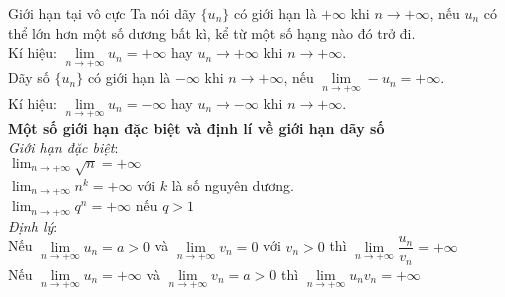 \begin{dang}{Giới hạn tại vô cực}
		Ta nói dãy $\{u_n\}$ có giới hạn là $+ \infty$ khi $n \rightarrow + \infty$, nếu $u_n$ có thể lớn hơn một số dương bất kì, kể từ một số hạng nào đó trở đi. \\
	Kí hiệu: $\lim \limits_{n \to +\infty}u_n = + \infty$ hay $u_n \rightarrow + \infty$ khi $n \rightarrow + \infty$. \\ 
	Dãy số $\{u_n\}$ có giới hạn là $- \infty$ khi $n \rightarrow + \infty$, nếu $\lim \limits_{n \to +\infty}- u_n = + \infty$. \\
	Kí hiệu: $\lim \limits_{n \to +\infty}u_n = - \infty$ hay $u_n \rightarrow - \infty$ khi $n \rightarrow + \infty$. \\ 
	\textbf{Một số giới hạn đặc biệt và định lí về giới hạn dãy số} \\
	\textit{Giới hạn đặc biệt}: \\
	$\displaystyle \lim_{n \rightarrow + \infty} \sqrt{n} = + \infty$ \\
	$\displaystyle \lim_{n \rightarrow + \infty} n^k = + \infty$ với $k$ là số nguyên dương. \\
	$\displaystyle \lim_{n \rightarrow + \infty} q^n = + \infty$ nếu $q > 1$ \\
	\textit{Định lý}: \\
	Nếu $\lim \limits_{n \to +\infty}u_n = a > 0$ và $\lim \limits_{n \to +\infty}v_n = 0$ với $v_n > 0$ thì $\lim \limits_{n \to +\infty}\dfrac{u_n}{v_n} = + \infty$ \\
	Nếu $\lim \limits_{n \to +\infty}u_n = + \infty$ và $\lim \limits_{n \to +\infty}v_n = a > 0$ thì $\lim \limits_{n \to +\infty}u_nv_n = + \infty$ \\
\end{dang}

